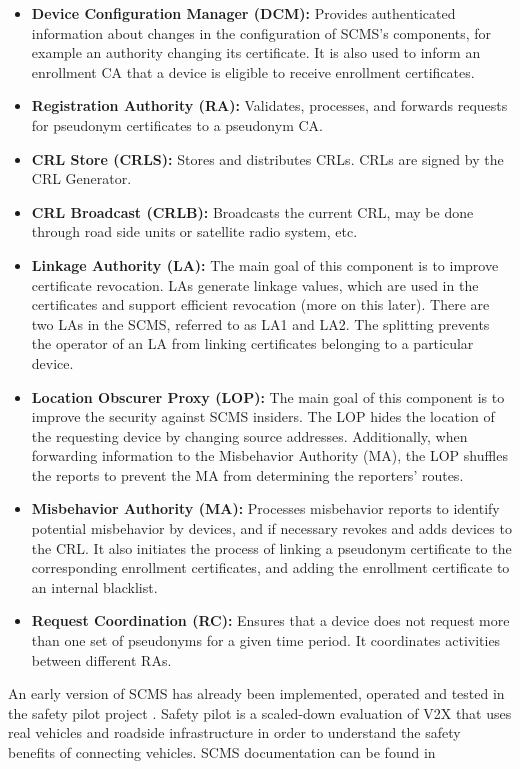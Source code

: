 \begin{itemize}
	\item \textbf{Device Configuration Manager (DCM):} Provides authenticated information about changes in the configuration of SCMS's components, for example an authority changing its certificate. It is also used to inform an enrollment CA that a device is eligible to receive enrollment certificates.
	\item \textbf{Registration Authority (RA):} Validates, processes, and forwards requests for pseudonym certificates to a pseudonym CA.
	\item \textbf{CRL Store (CRLS):} Stores and distributes CRLs. CRLs are signed by the CRL Generator.
	\item \textbf{CRL Broadcast (CRLB):} Broadcasts the current CRL, may be done through road side units or satellite radio system, etc.
	\item \textbf{Linkage Authority (LA):} The main goal of this component is to improve certificate revocation. LAs generate linkage values, which are used in the certificates and support efficient revocation (more on this later). There are two LAs in the SCMS, referred to as LA1 and LA2. The splitting prevents the operator of an LA from linking certificates belonging to a particular device. 
	\item \textbf{Location Obscurer Proxy (LOP):} The main goal of this component is to improve the security against SCMS insiders. The LOP hides the location of the requesting device by changing source addresses. Additionally, when forwarding information to the Misbehavior Authority (MA), the LOP shuffles the reports to prevent the MA from determining the reporters’ routes.
	\item \textbf{Misbehavior Authority (MA):} Processes misbehavior reports to identify potential misbehavior by devices, and if necessary revokes and adds devices to the CRL. It also initiates the process of linking a pseudonym certificate to the corresponding enrollment certificates, and adding the enrollment certificate to an internal blacklist.
	\item \textbf{Request Coordination (RC):} Ensures that a device does not request more than one set of pseudonyms for a given time period. It coordinates activities between different RAs.
\end{itemize}

An early version of SCMS has already been implemented, operated and tested in the safety pilot project \cite{safty_pilot}. Safety pilot is a scaled-down evaluation of V2X that uses real vehicles and roadside infrastructure in order to understand the safety benefits of connecting vehicles. SCMS documentation can be found in \cite{scms_doc}

